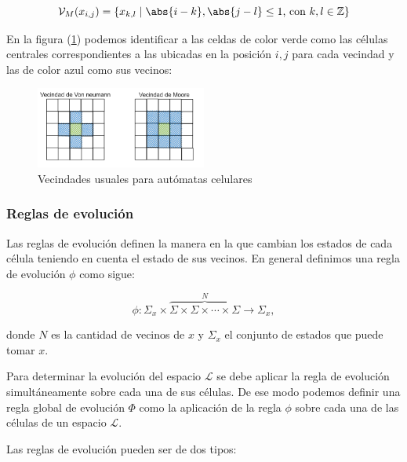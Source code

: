 $$\mathcal{V}_M(x_{i,j}) = \{x_{k,l}\mid\abs{i-k},\abs{j-l}\leq1\text{, con }k,l\in\mathbb{Z}\}$$

En la figura (\ref{fig:Moore - Von neumann}) podemos identificar a las celdas de color verde como las células centrales correspondientes a las ubicadas en la posición $i,j$ para cada vecindad y las de color azul como sus vecinos:

\begin{figure}[h]
  \centering
    \includegraphics[width=0.5\textwidth]{Imagenes/vecindades.PNG}
  \caption{Vecindades usuales para autómatas celulares}
  \label{fig:Moore - Von neumann}
\end{figure}


\subsubsection{Reglas de evolución}

Las reglas de evolución definen la manera en la que cambian los estados de cada célula teniendo en cuenta el estado de sus vecinos. En general definimos una regla de evolución $\phi$ como sigue:

$$\phi:\Sigma_x\times\overbrace{\Sigma\times\Sigma\times\cdots\times\Sigma}^{N}\longrightarrow\Sigma_x,$$

donde $N$ es la cantidad de vecinos de $x$ y $\Sigma_x$ el conjunto de estados que puede tomar $x$. 

Para determinar la evolución del espacio $\mathcal{L}$ se debe aplicar la regla de evolución simultáneamente sobre cada una de sus células. De ese modo podemos definir una regla global de evolución $\Phi$ como la aplicación de la regla $\phi$ sobre cada una de las células de un espacio $\mathcal{L}$.

Las reglas de evolución pueden ser de dos tipos:

